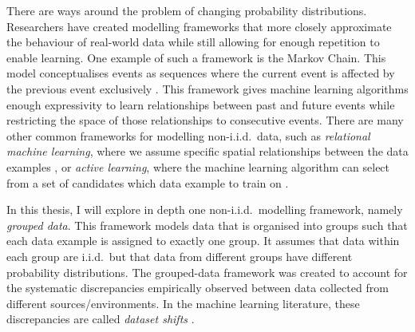 \documentclass[../thesis.tex]{subfiles}
\begin{document}
There are ways around the problem of changing probability distributions. Researchers have created modelling frameworks that more closely approximate the behaviour of real-world data while still allowing for enough repetition to enable learning. One example of such a framework is the Markov Chain. This model conceptualises events as sequences where the current event is affected by the previous event exclusively \citep{gagniucMarkovChainsTheory2017}. This framework gives machine learning algorithms enough expressivity to learn relationships between past and future events while restricting the space of those relationships to consecutive events. There are many other common frameworks for modelling non-i.i.d.\ data, such as \textit{relational machine learning}, where we assume specific spatial relationships between the data examples \citep{nickelReviewRelationalMachine2016}, or \textit{active learning}, where the machine learning algorithm can select from a set of candidates which data example to train on \citep{settlesActiveLearningLiterature2009a}.

In this thesis, I will explore in depth one non-i.i.d.\ modelling framework, namely \textit{grouped data}. This framework models data that is organised into groups such that each data example is assigned to exactly one group. It assumes that data within each group are i.i.d.\ but that data from different groups have different probability distributions. The grouped-data framework was created to account for the systematic discrepancies empirically observed between data collected from different sources/environments. In the machine learning literature, these discrepancies are called \textit{dataset shifts} \citep{quinonero-candelaDatasetShiftMachine2008}.


\end{document}
